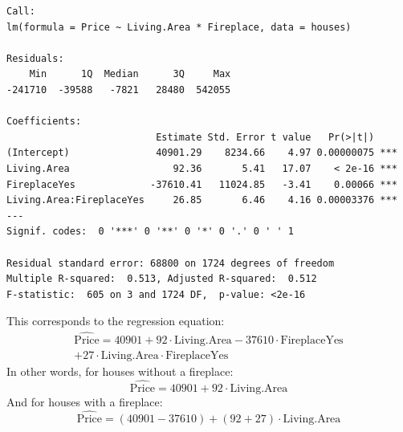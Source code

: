 \documentclass{beamer}\usepackage[]{graphicx}\usepackage[]{color}
\makeatletter
\newenvironment{kframe}{%
 \def\at@end@of@kframe{}%
 \ifinner\ifhmode%
  \def\at@end@of@kframe{\end{minipage}}%
  \begin{minipage}{\columnwidth}%
 \fi\fi%
 \def\FrameCommand##1{\hskip\@totalleftmargin \hskip-\fboxsep
 \colorbox{shadecolor}{##1}\hskip-\fboxsep
     \hskip-\linewidth \hskip-\@totalleftmargin \hskip\columnwidth}%
 \MakeFramed {\advance\hsize-\width
   \@totalleftmargin\z@ \linewidth\hsize
   \@setminipage}}%
 {\par\unskip\endMakeFramed%
 \at@end@of@kframe}
\newenvironment{knitrout}{}{} %
\makeatother
\begin{document}
\begin{darkframes}
\begin{frame}[fragile]
\begin{knitrout}
\begin{kframe}
\begin{verbatim}
Call:
lm(formula = Price ~ Living.Area * Fireplace, data = houses)

Residuals:
    Min      1Q  Median      3Q     Max 
-241710  -39588   -7821   28480  542055 

Coefficients:
                          Estimate Std. Error t value   Pr(>|t|)    
(Intercept)               40901.29    8234.66    4.97 0.00000075 ***
Living.Area                  92.36       5.41   17.07    < 2e-16 ***
FireplaceYes             -37610.41   11024.85   -3.41    0.00066 ***
Living.Area:FireplaceYes     26.85       6.46    4.16 0.00003376 ***
---
Signif. codes:  0 '***' 0 '**' 0 '*' 0 '.' 0 ' ' 1

Residual standard error: 68800 on 1724 degrees of freedom
Multiple R-squared:  0.513,	Adjusted R-squared:  0.512 
F-statistic:  605 on 3 and 1724 DF,  p-value: <2e-16
\end{verbatim}
\end{kframe}
\end{knitrout}
    \end{frame}

    \begin{frame}
      This corresponds to the regression equation:
      \begin{multline*}
        \widehat{\text{Price}} = 40901
          + 92 \cdot\text{Living.Area}
          - 37610 \cdot\text{FireplaceYes} \\
          + 27 \cdot\text{Living.Area}\cdot\text{FireplaceYes}
      \end{multline*}
      \pause
      In other words, for houses without a fireplace:
      \[
        \widehat{\text{Price}} = 40901
        + 92 \cdot\text{Living.Area}
      \]
      \pause
      And for houses with a fireplace:
      \[
        \widehat{\text{Price}} = (40901 - 37610)
        + (92 + 27) \cdot\text{Living.Area}
      \]
    \end{frame}


\end{darkframes}
\end{document}
